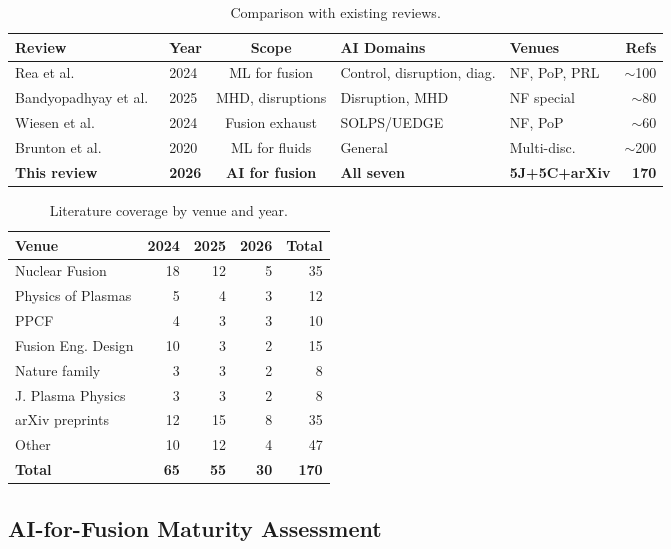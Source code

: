\documentclass[12pt,a4paper]{article}
\begin{document}
\begin{CJK}{UTF8}{gbsai}
\begin{table}[htbp]
\centering
\caption{Comparison with existing reviews.}
\label{tab:comparison}
\begin{tabular}{llcllr}
\toprule
Review & Year & Scope & AI Domains & Venues & Refs \\
\midrule
Rea et al.~\citep{Rea2024RMP} & 2024 & ML for fusion & Control, disruption, diag. & NF, PoP, PRL & $\sim$100 \\
Bandyopadhyay et al.~\citep{Bandyopadhyay2025} & 2025 & MHD, disruptions & Disruption, MHD & NF special & $\sim$80 \\
Wiesen et al.~\citep{Wiesen2024} & 2024 & Fusion exhaust & SOLPS/UEDGE & NF, PoP & $\sim$60 \\
Brunton et al.~\citep{Brunton2020} & 2020 & ML for fluids & General & Multi-disc. & $\sim$200 \\
\textbf{This review} & \textbf{2026} & \textbf{AI for fusion} & \textbf{All seven} & \textbf{5J+5C+arXiv} & \textbf{170} \\
\bottomrule
\end{tabular}
\end{table}

\begin{table}[htbp]
\centering
\caption{Literature coverage by venue and year.}
\label{tab:coverage}
\begin{tabular}{lrrrr}
\toprule
Venue & 2024 & 2025 & 2026 & Total \\
\midrule
Nuclear Fusion & 18 & 12 & 5 & 35 \\
Physics of Plasmas & 5 & 4 & 3 & 12 \\
PPCF & 4 & 3 & 3 & 10 \\
Fusion Eng. Design & 10 & 3 & 2 & 15 \\
Nature family & 3 & 3 & 2 & 8 \\
J. Plasma Physics & 3 & 3 & 2 & 8 \\
arXiv preprints & 12 & 15 & 8 & 35 \\
Other & 10 & 12 & 4 & 47 \\
\midrule
\textbf{Total} & \textbf{65} & \textbf{55} & \textbf{30} & \textbf{170} \\
\bottomrule
\end{tabular}
\end{table}

\subsection{AI-for-Fusion Maturity Assessment}


\end{CJK}
\end{document}
